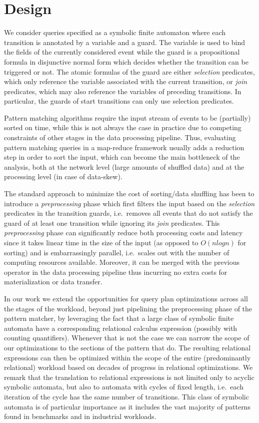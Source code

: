 \section{Design}


We consider queries specified as a symbolic finite automaton where each
transition is annotated by a variable and a guard.
The variable is used to bind the fields of the currently considered event while 
the guard is a propositional formula in disjunctive normal form which decides 
whether the transition can be triggered or not.  
The atomic formulas of the guard are either {\em selection} predicates, which 
only reference the variable associated with the current transition,
or {\em join} predicates, which may also reference the variables of preceding 
transitions.
In particular, the guards of start transitions can only use selection 
predicates.  
   
Pattern matching algorithms require the input stream of events to be
(partially) sorted on time, while this is not always the case in practice due
to competing constraints of other stages in the data processing pipeline. 
Thus, evaluating pattern matching queries in a map-reduce framework usually 
adds a reduction step in order to sort the input, which can become the main 
bottleneck of the analysis, both at the network level (large amounts of 
shuffled data) and at the processing level (in case of data-skew).

The standard approach to minimize the cost of sorting/data shuffling has been 
to introduce a {\em preprocessing} phase which first filters the input based on 
the {\em selection} predicates in the transition guards, i.e.\ removes all 
events that do not satisfy the guard of at least one transition while ignoring 
its {\em join} predicates.
This {\em preprocessing} phase can significantly reduce both processing costs 
and latency since it takes linear time in the size of the input (as opposed to 
$O(nlogn)$ for sorting) and is embarrassingly parallel, i.e.\ scales out with 
the number of computing resources available.
Moreover, it can be merged with the previous operator in the data processing 
pipeline thus incurring no extra costs for materialization or data transfer.    


In our work we extend the opportunities for query plan optimizations across all 
the stages of the workload, beyond just pipelining the preprocessing phase of 
the pattern matcher, by leveraging the fact that a large class of symbolic 
finite automata have a corresponding relational calculus expression (possibly 
with counting quantifiers).
Whenever that is not the case we can narrow the scope of our optimizations to 
the sections of the pattern that do.
The resulting relational expressions can then be optimized within the scope of 
the entire (predominantly relational) workload based on decades of progress in 
relational optimizations.  
We remark that the translation to relational expressions is not limited only to 
acyclic symbolic automata, but also to automata with cycles of fixed length, 
i.e.\ each iteration of the cycle has the same number of transitions.
This class of symbolic automata is of particular importance as it includes the 
vast majority of patterns found in benchmarks and in industrial workloads.  


